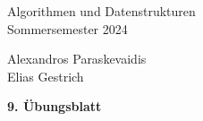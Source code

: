 \documentclass[11pt]{scrartcl}
\newcommand{\sheetNum}{9} %
\newcommand{\studentOne}{Alexandros Paraskevaidis} %
\newcommand{\studentTwo}{Elias Gestrich} %
\begin{document}
\begin{small}
\begin{minipage}{0.5 \linewidth}
  Algorithmen und Datenstrukturen\\
  Sommersemester 2024
\end{minipage}
\begin{minipage}{0.5\linewidth}
  \begin{flushright}
    \studentOne\\
    \studentTwo
  \end{flushright}
\end{minipage}
\end{small}
\begin{center}
\begin{sffamily}\Large\bfseries \sheetNum. Übungsblatt\end{sffamily}
\end{center}
\end{document}
